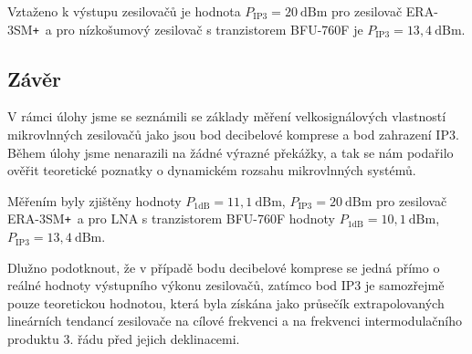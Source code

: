 \documentclass[11pt,a4paper]{article}
\newcommand{\plus}{{\texttt{+}}}
\begin{document}
Vztaženo k výstupu zesilovačů je hodnota $P_{\mathrm{IP3}} = 20~\mathrm{dBm}$ pro zesilovač ERA-3SM\plus~a pro nízkošumový zesilovač s tranzistorem BFU-760F je $P_{\mathrm{IP3}} = 13,4~\mathrm{dBm}$.

\subsection*{Závěr}
V rámci úlohy jsme se seznámili se základy měření velkosignálových vlastností mikrovlnných zesilovačů jako jsou bod decibelové komprese a bod zahrazení IP3. Během úlohy jsme nenarazili na žádné výrazné překážky, a tak se nám podařilo ověřit teoretické poznatky o dynamickém rozsahu mikrovlnných systémů.

Měřením byly zjištěny hodnoty $P_{1\mathrm{dB}} = 11,1~\mathrm{dBm}$, $P_{\mathrm{IP3}} = 20~\mathrm{dBm}$ pro zesilovač ERA-3SM\plus~a pro LNA s tranzistorem BFU-760F hodnoty $P_{1\mathrm{dB}} = 10,1~\mathrm{dBm}$, $P_{\mathrm{IP3}} = 13,4~\mathrm{dBm}$.

Dlužno podotknout, že v případě bodu decibelové komprese se jedná přímo o reálné hodnoty výstupního výkonu zesilovačů, zatímco bod IP3 je samozřejmě pouze teoretickou hodnotou, která byla získána jako průsečík extrapolovaných lineárních tendancí zesilovače na cílové frekvenci a na frekvenci intermodulačního produktu 3. řádu před jejich deklinacemi.
\end{document}
